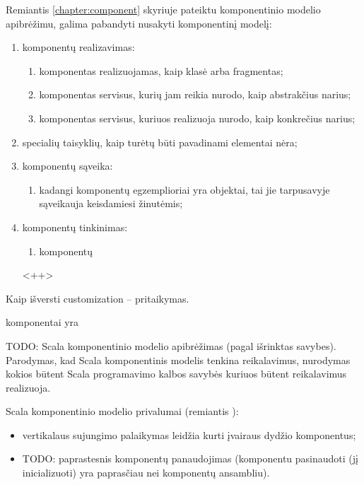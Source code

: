Remiantis \ref{chapter:component} skyriuje pateiktu komponentinio
modelio apibrėžimu, galima pabandyti nusakyti 
komponentinį modelį:
\begin{enumerate}
  \item komponentų realizavimas:
    \begin{enumerate}
      \item komponentas realizuojamas, kaip klasė arba fragmentas;
      \item komponentas servisus, kurių jam reikia nurodo, kaip
        abstrakčius narius;
      \item komponentas servisus, kuriuos realizuoja nurodo, kaip
        konkrečius narius;
    \end{enumerate}
  \item specialių taisyklių, kaip turėtų būti pavadinami elementai
    nėra;
  \item komponentų sąveika:
    \begin{enumerate}
      \item kadangi komponentų egzemplioriai 
        yra objektai, tai jie tarpusavyje sąveikauja keisdamiesi
        žinutėmis;
    \end{enumerate}
  \item komponentų tinkinimas:
    \begin{enumerate}
      \item komponentų 
    \end{enumerate}<++>
\end{enumerate}
Kaip išversti customization – pritaikymas.


 komponentai yra 

TODO: Scala komponentinio modelio apibrėžimas (pagal išrinktas savybes).
Parodymas, kad Scala komponentinis modelis tenkina reikalavimus,
nurodymas kokios būtent Scala programavimo kalbos savybės kuriuos
būtent reikalavimus realizuoja.

Scala komponentinio modelio privalumai (remiantis
\cite{classification-framework-for-scm}):
\begin{itemize}
  \item vertikalaus sujungimo\cite[599]{classification-framework-for-scm}
    palaikymas leidžia kurti įvairaus dydžio  komponentus;
  \item TODO: paprastesnis komponentų panaudojimas (komponentu
    pasinaudoti (jį inicializuoti) yra paprasčiau nei komponentų
    ansambliu).
\end{itemize}

